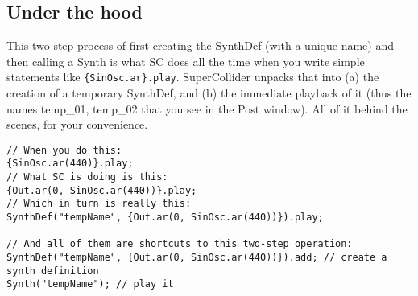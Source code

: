 \subsection{Under the hood}

This two-step process of first creating the SynthDef (with a unique name) and then calling a Synth is what SC does all the time when you write simple statements like \texttt{\{SinOsc.ar\}.play}. SuperCollider unpacks that into (a) the creation of a temporary SynthDef, and (b) the immediate playback of it (thus the names temp\_01, temp\_02 that you see in the Post window). All of it behind the scenes, for your convenience.
 
\begin{lstlisting}[style=SuperCollider-IDE, basicstyle=\scttfamily\footnotesize]
// When you do this:
{SinOsc.ar(440)}.play;
// What SC is doing is this:
{Out.ar(0, SinOsc.ar(440))}.play;
// Which in turn is really this:
SynthDef("tempName", {Out.ar(0, SinOsc.ar(440))}).play;

// And all of them are shortcuts to this two-step operation:
SynthDef("tempName", {Out.ar(0, SinOsc.ar(440))}).add; // create a synth definition
Synth("tempName"); // play it
\end{lstlisting}